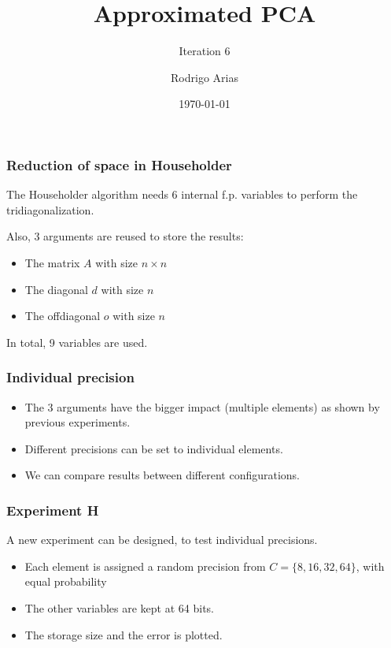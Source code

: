 \documentclass[serif, 12pt]{beamer}
\title{Approximated PCA}
\subtitle{Iteration 6}
\author{Rodrigo Arias} %
\date{\today} %
\begin{document}
\begin{frame}
	\titlepage
\end{frame}


\begin{frame}

\frametitle{Reduction of space in Householder}

The Householder algorithm needs 6 internal f.p. variables to perform the 
tridiagonalization.

\vspace{1em}

Also, 3 arguments are reused to store the results:
\begin{itemize}
\item The matrix $A$ with size $n\times n$
\item The diagonal $d$ with size $n$
\item The offdiagonal $o$ with size $n$
\end{itemize}

\vspace{1em}

In total, 9 variables are used.

\end{frame}


\begin{frame}

\frametitle{Individual precision}

\begin{itemize}
\item The 3 arguments have the bigger impact (multiple elements) as shown by 
previous experiments.
\item Different precisions can be set to individual elements.
\item We can compare results between different configurations.
\end{itemize}

\end{frame}


\begin{frame}
\frametitle{Experiment H}

A new experiment can be designed, to test individual precisions.
\vspace{1em}

\begin{itemize}

\item Each element is assigned a random precision from $C = \{8, 16, 32, 64\}$, 
with equal probability
\item The other variables are kept at 64 bits.
\item The storage size and the error is plotted.

\end{itemize}

\end{frame}
\end{document}
